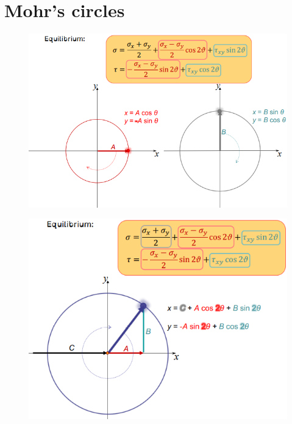 \documentclass[class=report, crop=false, 12pt,a4paper]{standalone}
\begin{document}
\section{Mohr's circles}
\begin{figure}[H]
    \centering
    \includegraphics[height = 0.3 \textheight]{../img/diagram46.png}
    \caption{}
\end{figure}
\begin{figure}[H]
    \centering
    \includegraphics[height = 0.3 \textheight]{../img/diagram47.png}
    \caption{}
\end{figure}
\end{document}
